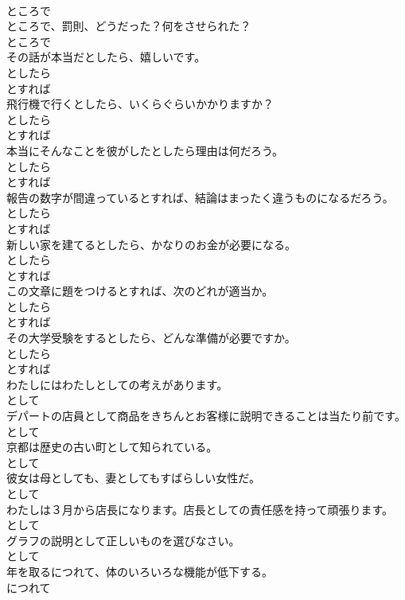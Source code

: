 \documentclass[8pt]{extreport}
\begin{document}
\begin{CJK}{UTF8}{min}
\\	ところで
\\	ところで、罰則、どうだった？何をさせられた？	
\\	ところで
\\	その話が本当だとしたら、嬉しいです。	
\\	としたら 
\\	とすれば
\\	飛行機で行くとしたら、いくらぐらいかかりますか？	
\\	としたら 
\\	とすれば
\\	本当にそんなことを彼がしたとしたら理由は何だろう。	
\\	としたら 
\\	とすれば
\\	報告の数字が間違っているとすれば、結論はまったく違うものになるだろう。	
\\	としたら 
\\	とすれば
\\	新しい家を建てるとしたら、かなりのお金が必要になる。	
\\	としたら 
\\	とすれば
\\	この文章に題をつけるとすれば、次のどれが適当か。	
\\	としたら 
\\	とすれば
\\	その大学受験をするとしたら、どんな準備が必要ですか。	
\\	としたら 
\\	とすれば
\\	わたしにはわたしとしての考えがあります。	
\\	として
\\	デパートの店員として商品をきちんとお客様に説明できることは当たり前です。	
\\	として
\\	京都は歴史の古い町として知られている。	
\\	として
\\	彼女は母としても、妻としてもすばらしい女性だ。	
\\	として
\\	わたしは３月から店長になります。店長としての責任感を持って頑張ります。	
\\	として
\\	グラフの説明として正しいものを選びなさい。	
\\	として
\\	年を取るにつれて、体のいろいろな機能が低下する。	
\\	につれて

\end{CJK}
\end{document}
